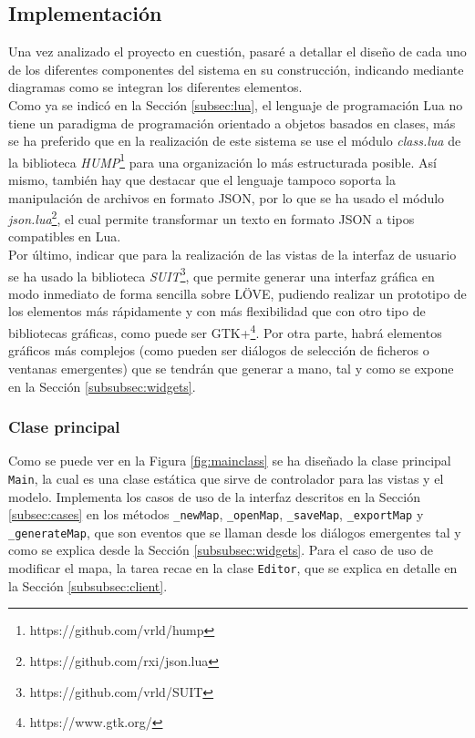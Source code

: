 \subsection{Implementación}
\label{subsec:implementacion}

Una vez analizado el proyecto en cuestión, pasaré a detallar el diseño de cada uno de los diferentes componentes del sistema en su construcción, indicando mediante diagramas como se integran los diferentes elementos. \\

Como ya se indicó en la Sección \ref{subsec:lua}, el lenguaje de programación Lua no tiene un paradigma de programación orientado a objetos basados en clases, más se ha preferido que en la realización de este sistema se use el módulo \textit{class.lua} de la biblioteca \textit{HUMP}\footnote{https://github.com/vrld/hump} para una organización lo más estructurada posible. Así mismo, también hay que destacar que el lenguaje tampoco soporta la manipulación de archivos en formato JSON, por lo que se ha usado el módulo \textit{json.lua}\footnote{https://github.com/rxi/json.lua}, el cual permite transformar un texto en formato JSON a tipos compatibles en Lua. \\

Por último, indicar que para la realización de las vistas de la interfaz de usuario se ha usado la biblioteca \textit{SUIT}\footnote{https://github.com/vrld/SUIT}, que permite generar una interfaz gráfica en modo inmediato de forma sencilla sobre LÖVE, pudiendo realizar un prototipo de los elementos más rápidamente y con más flexibilidad que con otro tipo de bibliotecas gráficas, como puede ser GTK+\footnote{https://www.gtk.org/}. Por otra parte, habrá elementos gráficos más complejos (como pueden ser diálogos de selección de ficheros o ventanas emergentes) que se tendrán que generar a mano, tal y como se expone en la Sección \ref{subsubsec:widgets}.

\subsubsection{Clase principal}
\label{subsubsec:main}

Como se puede ver en la Figura \ref{fig:mainclass} se ha diseñado la clase principal \texttt{Main}, la cual es una clase estática que sirve de controlador para las vistas y el modelo. Implementa los casos de uso de la interfaz descritos en la Sección \ref{subsec:cases} en los métodos \texttt{\_newMap}, \texttt{\_openMap}, \texttt{\_saveMap}, \texttt{\_exportMap} y \texttt{\_generateMap}, que son eventos que se llaman desde los diálogos emergentes tal y como se explica desde la Sección \ref{subsubsec:widgets}. Para el caso de uso de modificar el mapa, la tarea recae en la clase \texttt{Editor}, que se explica en detalle en la Sección \ref{subsubsec:client}. \\

